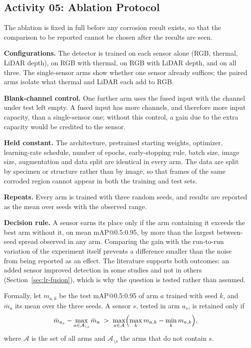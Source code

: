 \subsection{Activity 05: Ablation Protocol}
\label{sec:ablation}

The ablation is fixed in full before any corrosion result exists, so that the
comparison to be reported cannot be chosen after the results are seen.

\textbf{Configurations.} The detector is trained on each sensor alone (RGB,
thermal, LiDAR depth), on RGB with thermal, on RGB with LiDAR depth, and on all
three. The single-sensor arms show whether one sensor already suffices; the
paired arms isolate what thermal and LiDAR each add to RGB.

\textbf{Blank-channel control.} One further arm uses the fused input with the
channel under test left empty. A fused input has more channels, and therefore
more input capacity, than a single-sensor one; without this control, a gain due
to the extra capacity would be credited to the sensor.

\textbf{Held constant.} The architecture, pretrained starting weights, optimizer,
learning-rate schedule, number of epochs, early-stopping rule, batch size, image
size, augmentation and data split are identical in every arm. The data are split
by specimen or structure rather than by image, so that frames of the same
corroded region cannot appear in both the training and test sets.

\textbf{Repeats.} Every arm is trained with three random seeds, and results are
reported as the mean over seeds with the observed range.

\textbf{Decision rule.} A sensor earns its place only if the arm containing it
exceeds the best arm without it, on mean mAP@0.5:0.95, by more than the largest
between-seed spread observed in any arm. Comparing the gain with the run-to-run
variation of the experiment itself prevents a difference smaller than the noise
from being reported as an effect. The literature supports both outcomes: an
added sensor improved detection in some studies and not in others
(Section~\ref{sec:lr-fusion}), which is why the question is tested rather than
assumed.

Formally, let $m_{a,k}$ be the test mAP@0.5:0.95 of arm $a$ trained with seed
$k$, and $\bar{m}_a$ its mean over the three seeds. A sensor $s$, tested in
arm $a_s$, is retained only if
\begin{equation}
\bar{m}_{a_s} - \max_{a \in \mathcal{A}_{\setminus s}} \bar{m}_a \;>\;
\max_{a \in \mathcal{A}} \Bigl( \max_k m_{a,k} - \min_k m_{a,k} \Bigr),
\label{eq:decision}
\end{equation}
where $\mathcal{A}$ is the set of all arms and $\mathcal{A}_{\setminus s}$ the
arms that do not contain $s$.

